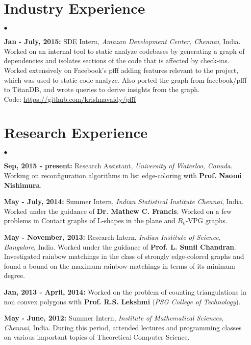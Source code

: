 \documentclass[margin,line]{res}
\newenvironment{list2}{
  \begin{list}{$\bullet$}{%
      \setlength{\itemsep}{0in}
      \setlength{\parsep}{0in} \setlength{\parskip}{0in}
      \setlength{\topsep}{0in} \setlength{\partopsep}{0in} 
      \setlength{\leftmargin}{0.2in}}}{\end{list}}
\begin{document}
\begin{resume}
\section{\sc Industry Experience}
\begin{list2}
\item \textbf{Jan - July, 2015:} SDE Intern, \textit{Amazon Development Center, Chennai}, India.  Worked on
an internal tool to static analyze codebases by generating a graph of dependencies and isolates
sections of the code that is affected by check-ins.  Worked extensively on Facebook's pfff adding features relevant to the project, which was used to static code analyze.  Also ported the graph from facebook/pfff to TitanDB, and wrote queries to derive insights from the graph. \\Code: \url{https://github.com/krishnavaidy/pfff}
\end{list2}

\section{\sc Research Experience}
\begin{list2}
\item \textbf{Sep, 2015 - present:} Research Assistant, \textit{University of Waterloo, Canada}. Working on reconfiguration algorithms in list edge-coloring with \textbf{Prof. Naomi Nishimura}.

\item \textbf{May - July, 2014:} Summer Intern, \textit{Indian Statistical Institute Chennai}, India. Worked under the guidance of \textbf{Dr. Mathew C. Francis}. Worked on a few problems in Contact graphs of L-shapes in the plane and $B_{k}$-VPG graphs.

\item \textbf{May -  November, 2013:} Research Intern, \textit{Indian Institute of Science, Bangalore}, India. Worked under the guidance of \textbf{Prof. L. Sunil Chandran}. Investigated rainbow matchings in the class of strongly edge-colored graphs and found a bound on the maximum rainbow matchings in terms of its minimum degree.

\item \textbf{Jan, 2013 - April, 2014:} Worked on the problem of counting triangulations in non convex polygons with \textbf{Prof. R.S. Lekshmi} (\textit{PSG College of Technology}).

\item \textbf{May - June, 2012:} Summer Intern, \textit{Institute of Mathematical Sciences, Chennai}, India. During this period, attended lectures and programming classes on various important topics of Theoretical Computer Science.
\end{list2}


\end{resume}
\end{document}
